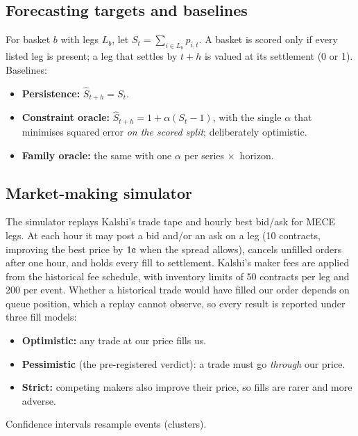 \documentclass[11pt,a4paper]{article}
\newcommand{\cent}{\text{\textcent}}
\newcommand{\x}{\ensuremath{\times}}
\begin{document}
\subsection{Forecasting targets and baselines}
For basket $b$ with legs $L_b$, let $S_t=\sum_{i\in L_b} p_{i,t}$. A basket is scored only if every listed leg is
present; a leg that settles by $t+h$ is valued at its settlement (0 or 1). Baselines:
\begin{itemize}
  \item \textbf{Persistence:} $\hat S_{t+h}=S_t$.
  \item \textbf{Constraint oracle:} $\hat S_{t+h}=1+\alpha(S_t-1)$, with the single $\alpha$ that minimises squared
    error \emph{on the scored split}; deliberately optimistic.
  \item \textbf{Family oracle:} the same with one $\alpha$ per series \x\ horizon.
\end{itemize}

\subsection{Market-making simulator}
The simulator replays Kalshi's trade tape and hourly best bid/ask for MECE legs. At each hour it may post a bid
and/or an ask on a leg (10 contracts, improving the best price by $1\cent$ when the spread allows), cancels unfilled
orders after one hour, and holds every fill to settlement. Kalshi's maker fees are applied from the historical fee
schedule, with inventory limits of 50 contracts per leg and 200 per event. Whether a historical trade would have
filled our order depends on queue position, which a replay cannot observe, so every result is reported under three
fill models:
\begin{itemize}
  \item \textbf{Optimistic:} any trade at our price fills us.
  \item \textbf{Pessimistic} (the pre-registered verdict): a trade must go \emph{through} our price.
  \item \textbf{Strict:} competing makers also improve their price, so fills are rarer and more adverse.
\end{itemize}
Confidence intervals resample events (clusters).
\end{document}
